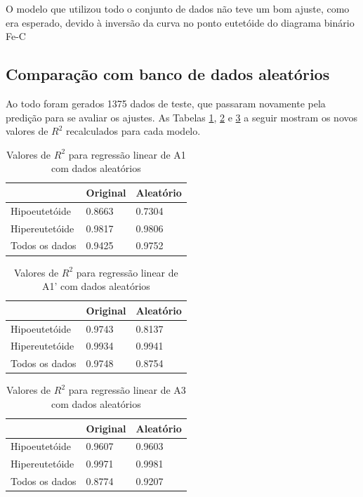 \documentclass[brazil,tf,epusp]{usp}  %
\begin{document}
O modelo que utilizou todo o conjunto de dados não teve um bom ajuste, como era esperado, devido à inversão da curva no ponto eutetóide do diagrama binário Fe-C

\subsection{Comparação com banco de dados aleatórios}
Ao todo foram gerados 1375 dados de teste, que passaram novamente pela predição para se avaliar os ajustes. As Tabelas \ref{tab:r2_A1_RL_random}, \ref{tab:r2_A1prime_RL_random} e \ref{tab:r2_A3_RL_random} a seguir mostram os novos valores de $R^{2}$ recalculados para cada modelo.

\begin{table}
  \caption{Valores de $R^{2}$ para regressão linear de A1 com dados aleatórios}

  \begin{tabular}{lll}
  \hline
                 & Original & Aleatório \\
  \hline
  Hipoeutetóide  & 0.8663   & 0.7304    \\
  Hipereutetóide & 0.9817   & 0.9806    \\
  Todos os dados & 0.9425   & 0.9752    \\
  \hline
  \end{tabular}

  \label{tab:r2_A1_RL_random}
\end{table}

\begin{table}
  \caption{Valores de $R^{2}$ para regressão linear de A1' com dados aleatórios}

  \begin{tabular}{lll}
  \hline
                 & Original & Aleatório \\
  \hline
  Hipoeutetóide  & 0.9743   & 0.8137    \\
  Hipereutetóide & 0.9934   & 0.9941    \\
  Todos os dados & 0.9748   & 0.8754    \\
  \hline
  \end{tabular}

  \label{tab:r2_A1prime_RL_random}
\end{table}

\begin{table}
  \caption{Valores de $R^{2}$ para regressão linear de A3 com dados aleatórios}

  \begin{tabular}{lll}
  \hline
                 & Original & Aleatório \\
  \hline
  Hipoeutetóide  & 0.9607   & 0.9603    \\
  Hipereutetóide & 0.9971   & 0.9981    \\
  Todos os dados & 0.8774   & 0.9207    \\
  \hline
  \end{tabular}

  \label{tab:r2_A3_RL_random}
\end{table}
\end{document}

